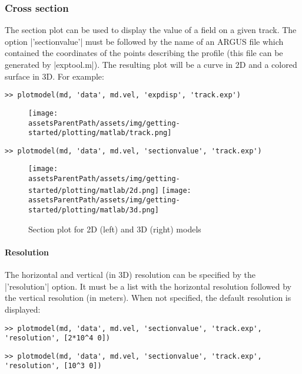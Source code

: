 \subsubsection{Cross section}%
The section plot can be used to display the value of a field on a given track. The option \lstinlinebg|'sectionvalue'| must be followed by the name of an ARGUS file which contained the coordinates of the points describing the profile (this file can be generated by \lstinlinebg|exptool.m|). The resulting plot will be a curve in 2D and a colored surface in 3D. For example:
\begin{lstlisting}
>> plotmodel(md, 'data', md.vel, 'expdisp', 'track.exp')
\end{lstlisting}
\begin{figure}[H]
	\begin{center}
		\texttt{[image: \\assetsParentPath/assets/img/getting-started/plotting/matlab/track.png]}
	\end{center}
\end{figure}
\begin{lstlisting}
>> plotmodel(md, 'data', md.vel, 'sectionvalue', 'track.exp')
\end{lstlisting}
\begin{figure}[H]
	\begin{center}
		\texttt{[image: \\assetsParentPath/assets/img/getting-started/plotting/matlab/2d.png]}
		\texttt{[image: \\assetsParentPath/assets/img/getting-started/plotting/matlab/3d.png]}
		\caption{Section plot for 2D (left) and 3D (right) models}
	\end{center}
\end{figure}

\paragraph{Resolution}
The horizontal and vertical (in 3D) resolution can be specified by the \lstinlinebg|'resolution'| option. It must be a list with the horizontal resolution followed by the vertical resolution (in meters). When not specified, the default resolution is displayed:
\begin{lstlisting}
>> plotmodel(md, 'data', md.vel, 'sectionvalue', 'track.exp', 'resolution', [2*10^4 0])
\end{lstlisting}
\begin{lstlisting}
>> plotmodel(md, 'data', md.vel, 'sectionvalue', 'track.exp', 'resolution', [10^3 0])
\end{lstlisting}

